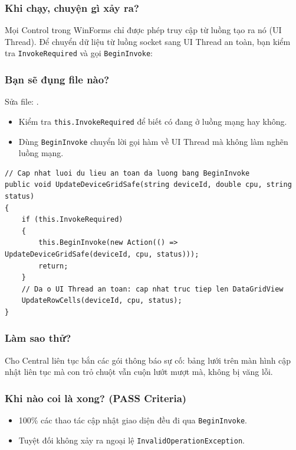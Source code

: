 \documentclass[12pt,a4paper]{article}
\begin{document}
\subsubsection{Khi chạy, chuyện gì xảy ra?}
Mọi Control trong WinForms chỉ được phép truy cập từ luồng tạo ra nó (UI Thread). Để chuyển dữ liệu từ luồng socket sang UI Thread an toàn, bạn kiểm tra \texttt{InvokeRequired} và gọi \texttt{BeginInvoke}:

\subsubsection{Bạn sẽ đụng file nào?}
Sửa file: .

\begin{orientationbox}
\begin{itemize}[leftmargin=1.5em, itemsep=1pt]
  \item Kiểm tra \texttt{this.InvokeRequired} để biết có đang ở luồng mạng hay không.
  \item Dùng \texttt{BeginInvoke} chuyển lời gọi hàm về UI Thread mà không làm nghẽn luồng mạng.
\end{itemize}
\end{orientationbox}

\begin{lstlisting}[language=CSharp, caption={Ví dụ rút gọn: Cập nhật giao diện an toàn đa luồng}]
// Cap nhat luoi du lieu an toan da luong bang BeginInvoke
public void UpdateDeviceGridSafe(string deviceId, double cpu, string status)
{
    if (this.InvokeRequired)
    {
        this.BeginInvoke(new Action(() => UpdateDeviceGridSafe(deviceId, cpu, status)));
        return;
    }
    // Da o UI Thread an toan: cap nhat truc tiep len DataGridView
    UpdateRowCells(deviceId, cpu, status);
}
\end{lstlisting}

\subsubsection{Làm sao thử?}
Cho Central liên tục bắn các gói thông báo sự cố: bảng lưới trên màn hình cập nhật liên tục mà con trỏ chuột vẫn cuộn lướt mượt mà, không bị văng lỗi.

\subsubsection{Khi nào coi là xong? (PASS Criteria)}
\begin{itemize}
  \item 100\% các thao tác cập nhật giao diện đều đi qua \texttt{BeginInvoke}.
  \item Tuyệt đối không xảy ra ngoại lệ \texttt{InvalidOperationException}.
\end{itemize}
\end{document}
